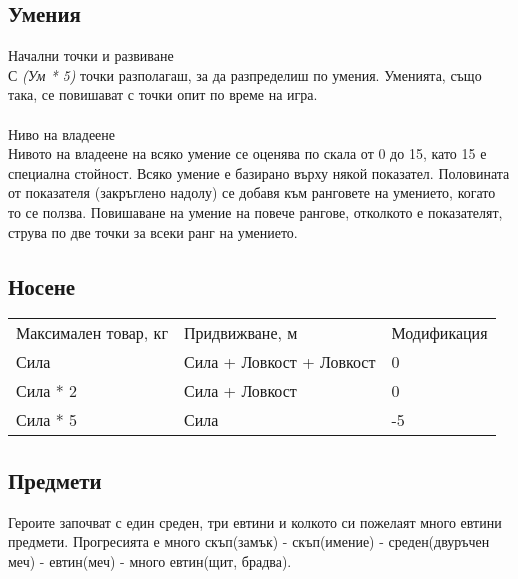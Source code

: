 \subsection{Умения}
Начални точки и развиване  \\
С \textit{(Ум * 5)} точки разполагаш, за да разпределиш по умения.
Уменията, също така, се повишават с точки опит по време на игра.
\\
\\
Ниво на владеене  \\
Нивото на владеене на всяко умение се оценява по скала от 0 до 15, като 15 е специална стойност.
Всяко умение е базирано върху някой показател.
Половината от показателя (закръглено надолу) се добавя към ранговете на умението, когато то се ползва.
Повишаване на умение на повече рангове,  отколкото е показателят, струва по две точки за всеки ранг на умението.

\subsection{Носене}
\begin{tabular}{l | l | l }
Максимален товар, кг & Придвижване, м            & Модификация  \\
Сила                 & Сила + Ловкост + Ловкост  &  0           \\
Сила * 2             & Сила + Ловкост            &  0           \\
Сила * 5             & Сила                      & -5
\end{tabular}


\subsection{Предмети}
Героите започват с един среден, три евтини и колкото си пожелаят много евтини предмети.
Прогресията е много скъп(замък) - скъп(имение) - среден(двуръчен меч) - евтин(меч) - много евтин(щит, брадва).

